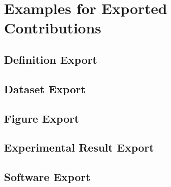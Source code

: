 \section{Examples for Exported Contributions}

\subsection{Definition Export}

\subsection{Dataset Export}

\subsection{Figure Export}

\subsection{Experimental Result Export}

\subsection{Software Export}

